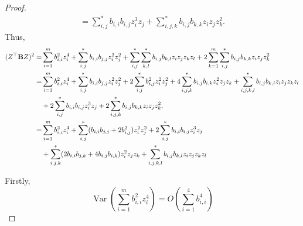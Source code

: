 \documentclass[11pt]{article}
\DeclareMathOperator{\myVar}{Var}
\theoremstyle{plain}
\theoremstyle{definition}
\theoremstyle{remark}
\begin{document}
\begin{proof}
\begin{equation*}
\begin{split}
     =
     \sum_{i,j}^* b_{i,i} b_{i,j}  z_i^3 z_j  
     +
     \sum_{i,j,k}^* b_{i,j} b_{k,k} z_{i} z_j z_k^2.
\end{split}
\end{equation*}
Thus,
\begin{equation*}
    \begin{split}
    (Z^\top \mathbf{B} Z)^2
    =&
    \sum_{i=1}^m b_{i,i}^2 z_{i}^4
    +\sum_{i,j}^* b_{i,i} b_{j,j} z_i^2 z_j^2
    + 
    \sum_{i,j}^* \sum_{k,l}^* b_{i,j} b_{k,l} z_i z_j z_k z_l
    +
    2
    \sum_{k=1}^m \sum_{i,j}^* b_{i,j} b_{k,k} z_i z_j z_{k}^2 
    \\
    =
    &
    \sum_{i=1}^m b_{i,i}^2 z_{i}^4
    +
    \sum_{i,j}^* b_{i,i} b_{j,j} z_i^2 z_j^2
    +
    2\sum_{i,j}^* b_{i,j}^2 z_i^2 z_j^2
    +4\sum_{i,j,k}^* b_{i,j} b_{i,k} z_i^2 z_j z_k
    +
    \sum_{i,j,k,l}^*
    b_{i,j} b_{k,l} z_i z_j z_k z_l
    \\
    &+
     2\sum_{i,j}^* b_{i,i} b_{i,j}  z_i^3 z_j  
     +
     2\sum_{i,j,k}^* b_{i,j} b_{k,k} z_{i} z_j z_k^2.
    \\
    =
    &
    \sum_{i=1}^m b_{i,i}^2 z_{i}^4
    +
    \sum_{i,j}^* (b_{i,i} b_{j,j} + 2 b_{i,j}^2 )
    z_i^2 z_j^2
    +
     2\sum_{i,j}^* b_{i,i} b_{i,j}  z_i^3 z_j  
     \\
     &+\sum_{i,j,k}^*  (2 b_{i,i} b_{j,k}+4 b_{i,j} b_{i,k}) z_i^2 z_j z_k
    +
    \sum_{i,j,k,l}^*
    b_{i,j} b_{k,l} z_i z_j z_k z_l
    \end{split}
\end{equation*}


Firstly,
\begin{equation*}
    \myVar \left(\sum_{i=1}^m b_{i,i}^2 z_{i}^4\right)=O(\sum_{i=1}^4 b_{i,i}^4)
\end{equation*}


\end{proof}
\end{document}
